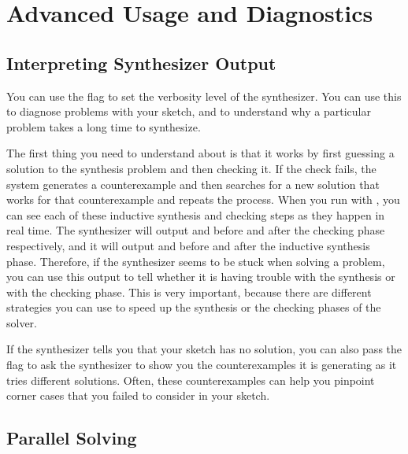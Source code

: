 \section{Advanced Usage and Diagnostics}


\subsection{Interpreting Synthesizer Output}
You can use the flag  to set the verbosity level of the synthesizer. You can use this to diagnose problems with your sketch, and to understand why a particular problem takes a long time to synthesize.

The first thing you need to understand about \Sk{} is that it works by first guessing a solution to the synthesis problem and then checking it. If the check fails, the system generates a counterexample and then searches for a new solution that works for that counterexample and repeats the process. When you run with , you can see each of these inductive synthesis and checking steps as they happen in real time. The synthesizer will output  and  before and after the checking phase respectively, and it will output  and  before and after the inductive synthesis phase. Therefore, if the synthesizer seems to be stuck when solving a problem, you can use this output to tell whether it is having trouble with the synthesis or with the checking phase. This is very important, because there are different strategies you can use to speed up the synthesis or the checking phases of the solver.

If the synthesizer tells you that your sketch has no solution, you can also pass the flag  to ask the synthesizer to show you the counterexamples it is generating as it tries different solutions. Often, these counterexamples can help you pinpoint corner cases that you failed to consider in your sketch.




\subsection{Parallel Solving}

